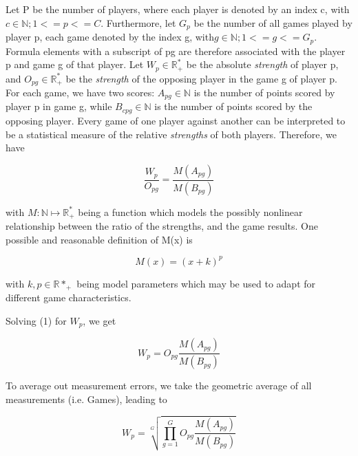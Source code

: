 \documentclass[a4paper]{article}
\begin{document}
Let P be the number of players, where each player is denoted by an index c, with $ c \in \mathbb{N} ; 1 <= p <= C $. Furthermore, let $ G _ p $ be the number of
all games played by player p, each game denoted by the index g, with$ g \in \mathbb{N} ; 1 <= g <= G_p $. Formula elements with a subscript of pg
are therefore associated with the player p and game g of that player. 
\newline
\newline
Let $ W _ p \in \mathbb{R^*_+} $ be the absolute \textit{strength} of player p, and 
$ O _{pg} \in \mathbb{R^*_+} $ be the \textit{strength} of the opposing player in the game g of player p. 
\newline
\newline
For each game, we have two scores: $ A_{pg} \in \mathbb{N} $ is the number of points scored by player p in game g, while $ B_{cpg} \in \mathbb{N} $
is the number of points scored by the opposing player.  
\newline
\newline
Every game of one player against another can be interpreted to be a statistical measure of the relative \textit{strengths} of both players. Therefore, we have

\begin{equation}
 \frac{W_p}{ O_{pg} } = \frac{M(A_{pg})}{M(B_{pg})}  
\end{equation}

with $ M : \mathbb{N} \mapsto \mathbb{R^*_+} $ being a function which models the possibly nonlinear relationship between the ratio of the strengths, and
the game results. One possible and reasonable definition of M(x) is

\begin{equation}
M(x) = ( x + k)^p
\end{equation}

with $ k,p \in \mathbb{R*_+} $ being model parameters which may be used to adapt for different game characteristics.
\par

Solving (1) for $ W_p $, we get

\begin{equation}
 W_p = O_{pg} \frac{M(A_{pg})}{M(B_{pg})}  
\end{equation}

To average out measurement errors, we take the geometric average of all measurements (i.e. Games), leading to

\begin{equation}
 W_p = \sqrt[G]{\displaystyle\prod_{g=1}^{G}{O_{pg}\frac{M(A_{pg})}{M(B_{pg})}}}
\end{equation}
\end{document}
